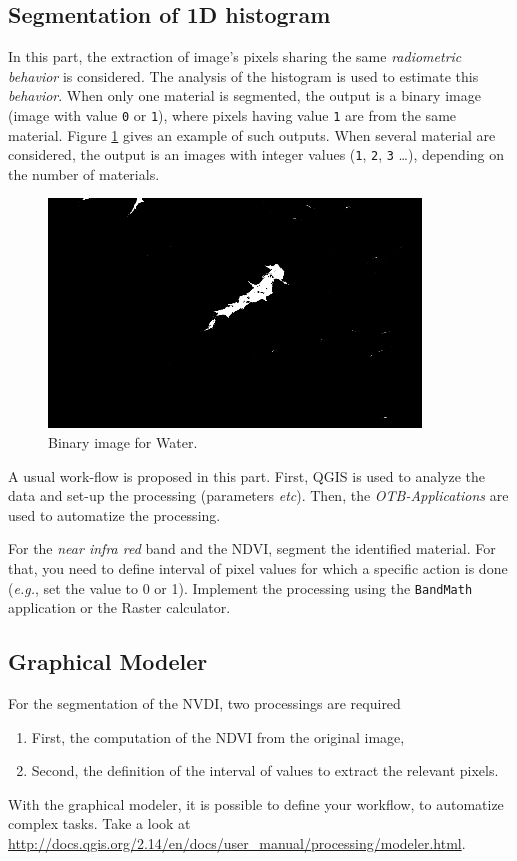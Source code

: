 \documentclass[a4paper,11pt,DIV=18]{scrartcl}
\begin{document}
\subsection{Segmentation of 1D histogram}
\label{sec:org5adbe7c}
In  this part,  the  extraction  of image's  pixels  sharing the  same
\emph{radiometric behavior} is considered.  The  analysis of the histogram is
used to estimate this \emph{behavior}.   When only one material is segmented,
the output is a  binary image (image with value \texttt{0}  or \texttt{1}), where pixels
having  value \texttt{1}  are from  the same  material.  Figure  \ref{fig:orgb54334c}
gives  an  example  of  such   outputs.   When  several  material  are
considered, the output is an images with integer values (\texttt{1}, \texttt{2}, \texttt{3} \ldots{}),
depending on the number of materials.

\begin{figure}[htbp]
\centering
\includegraphics[width=0.65\linewidth]{./figures/quicklook_seg_eau.png}
\caption{\label{fig:orgb54334c}
Binary image for Water.}
\end{figure}

A usual  work-flow is proposed  in this part.  First, QGIS is  used to
analyze the data and set-up the processing (parameters \emph{etc}). Then, the
\emph{OTB-Applications} are used to automatize the processing.

\begin{work}
For  the \emph{near  infra red}  band and  the NDVI,  segment the  identified
material. For  that, you need to  define interval of pixel  values for
which a  specific action  is done  (\emph{e.g.}, set  the value  to 0  or 1).
Implement the processing using the  \texttt{BandMath} application or the Raster
calculator.
\end{work}
\subsection{Graphical Modeler}
\label{sec:org1047d83}
For the segmentation of the NVDI, two processings are required
\begin{enumerate}
\item First, the computation of the NDVI from the original image,
\item Second,  the definition of  the interval  of values to  extract the
relevant pixels.
\end{enumerate}
With the graphical modeler, it is possible to define your workflow, to
automatize      complex      tasks.      Take      a      look      at
\url{http://docs.qgis.org/2.14/en/docs/user\_manual/processing/modeler.html}.  
\end{document}
